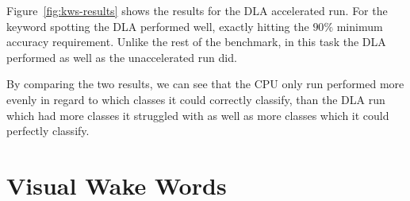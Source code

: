\documentclass[12pt,a4paper,english
]{tunithesis}
\begin{document}
Figure~\ref{fig:kws-results} shows the results for the DLA accelerated run. For the keyword spotting the DLA performed well, exactly hitting the $90\%$ minimum accuracy requirement.
Unlike the rest of the benchmark, in this task the DLA performed as well as the unaccelerated run did.

By comparing the two results, we can see that the CPU only run performed more evenly in regard to which classes it could correctly classify, than the DLA run which had more classes it struggled with as well as more classes which it could perfectly classify.

\section{Visual Wake Words}
\end{document}
